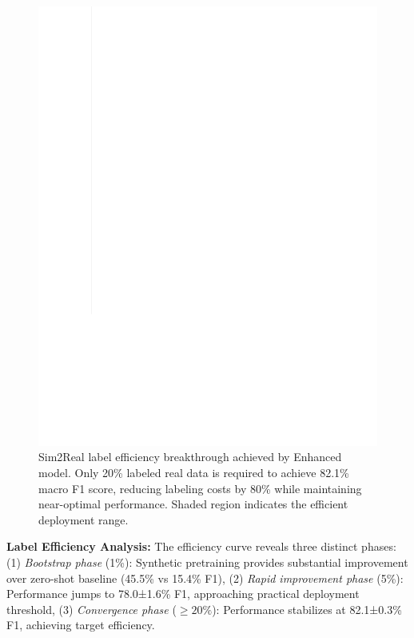 \documentclass[journal]{IEEEtran}
\begin{document}
\begin{figure}[ht]
\centering
\includegraphics[width=\columnwidth]{figures/figure4_stea_basic.pdf}
\caption{Sim2Real label efficiency breakthrough achieved by Enhanced model. Only 20\% labeled real data is required to achieve 82.1\% macro F1 score, reducing labeling costs by 80\% while maintaining near-optimal performance. Shaded region indicates the efficient deployment range.}
\label{fig:label_efficiency}
\end{figure}

\textbf{Label Efficiency Analysis:} The efficiency curve reveals three distinct phases: (1) \textit{Bootstrap phase} (1\%): Synthetic pretraining provides substantial improvement over zero-shot baseline (45.5\% vs 15.4\% F1), (2) \textit{Rapid improvement phase} (5\%): Performance jumps to 78.0±1.6\% F1, approaching practical deployment threshold, (3) \textit{Convergence phase} ($\geq 20\%$): Performance stabilizes at 82.1±0.3\% F1, achieving target efficiency.
\end{document}
